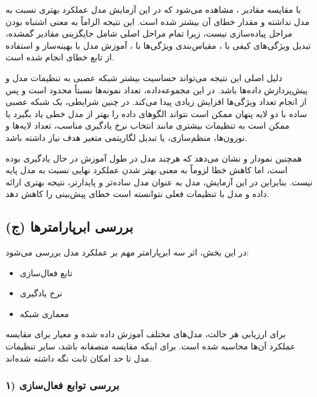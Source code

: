\documentclass[12pt,a4paper]{article}
\begin{document}
\begin{tcolorbox}[colback=softorange!5, colframe=orange, title=تحلیل نهایی]
	با مقایسه مقادیر ، مشاهده می‌شود که در این آزمایش مدل  عملکرد بهتری نسبت به مدل  نداشته و مقدار خطای آن بیشتر شده است. این نتیجه الزاماً به معنی اشتباه بودن مراحل پیاده‌سازی نیست، زیرا تمام مراحل اصلی شامل جایگزینی مقادیر گمشده، تبدیل ویژگی‌های کیفی با ، مقیاس‌بندی ویژگی‌ها با ، آموزش مدل با بهینه‌ساز  و استفاده از تابع خطای  انجام شده است.
	
	دلیل اصلی این نتیجه می‌تواند حساسیت بیشتر شبکه عصبی به تنظیمات مدل و پیش‌پردازش داده‌ها باشد. در این مجموعه‌داده، تعداد نمونه‌ها نسبتاً محدود است و پس از انجام  تعداد ویژگی‌ها افزایش زیادی پیدا می‌کند. در چنین شرایطی، یک شبکه عصبی ساده با دو لایه پنهان ممکن است نتواند الگوهای داده را بهتر از مدل خطی یاد بگیرد یا ممکن است به تنظیمات بیشتری مانند انتخاب نرخ یادگیری مناسب، تعداد لایه‌ها و نورون‌ها، منظم‌سازی،  یا تبدیل لگاریتمی متغیر هدف نیاز داشته باشد.
	
	همچنین نمودار  و  نشان می‌دهد که هرچند مدل در طول آموزش در حال یادگیری بوده است، اما کاهش خطا لزوماً به معنی بهتر شدن عملکرد نهایی نسبت به مدل پایه نیست. بنابراین در این آزمایش، مدل  به عنوان مدل ساده‌تر و پایدارتر، نتیجه بهتری ارائه داده و مدل  با تنظیمات فعلی نتوانسته است خطای پیش‌بینی را کاهش دهد.
\end{tcolorbox}


\subsection{(ج) بررسی ابرپارامترها}

در این بخش، اثر سه ابرپارامتر مهم بر عملکرد مدل  بررسی می‌شود:
\begin{itemize}
	\item تابع فعال‌سازی
	\item نرخ یادگیری
	\item معماری شبکه
\end{itemize}

برای ارزیابی هر حالت، مدل‌های مختلف آموزش داده شده و معیار  برای مقایسه عملکرد آن‌ها محاسبه شده است.  
برای اینکه مقایسه منصفانه باشد، سایر تنظیمات مدل تا حد امکان ثابت نگه داشته شده‌اند.

\subsubsection{۱) بررسی توابع فعال‌سازی}
\end{document}
